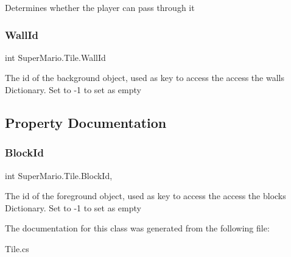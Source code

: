 Determines whether the player can pass through it 

\mbox{\label{class_super_mario_1_1_tile_a2568c2548122e42a75208f2a3bc851fe}} 
\subsubsection{\texorpdfstring{Wall\+Id}{WallId}}
{\footnotesize\ttfamily int Super\+Mario.\+Tile.\+Wall\+Id}



The id of the background object, used as key to access the access the walls Dictionary. Set to -\/1 to set as empty 



\subsection{Property Documentation}
\mbox{\label{class_super_mario_1_1_tile_a2bbfc4d23dcecaf5e3c1fee0501fae55}} 
\subsubsection{\texorpdfstring{Block\+Id}{BlockId}}
{\footnotesize\ttfamily int Super\+Mario.\+Tile.\+Block\+Id\hspace{0.3cm}{\ttfamily [get]}, {\ttfamily [set]}}



The id of the foreground object, used as key to access the access the blocks Dictionary. Set to -\/1 to set as empty 



The documentation for this class was generated from the following file\+:\begin{DoxyCompactItemize}
\item 
Tile.\+cs\end{DoxyCompactItemize}
